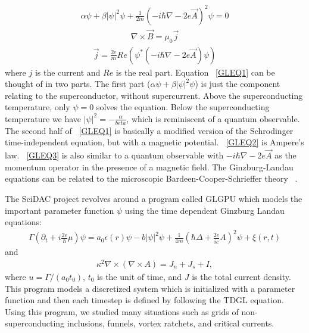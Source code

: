 \begin{eqnarray}
\alpha \psi + \beta |\psi|^2 \psi + \frac {1} {2m} (-i \hbar \nabla - 2 e \overrightarrow A)^2 \psi = 0
\label{GLEQ1}
\end{eqnarray}
\begin{eqnarray}
\nabla \times \overrightarrow B = \mu_0 \overrightarrow j
\label{GLEQ2}
\end{eqnarray}
\begin{eqnarray}
\overrightarrow j = \frac {2e} {m} Re(\psi^* (-i \hbar \nabla - 2 e \overrightarrow A) \psi)
\label{GLEQ3}
\end{eqnarray}
where $j$ is the current and $Re$ is the real part. Equation ~\ref{GLEQ1} can be thought of in two parts. The first part ($\alpha \psi + \beta |\psi|^2 \psi $) is just the component relating to the superconductor, without supercurrent. Above the superconducting temperature, only $\psi = 0$ solves the equation. Below the superconducting temperature we have $|\psi|^2 = -\frac {\alpha} {beta}$, which is reminiscent of a quantum observable. The second half of ~\ref{GLEQ1} is basically a modified version of the Schrodinger time-independent equation, but with a magnetic potential. ~\ref{GLEQ2} is Ampere's law. ~\ref{GLEQ3} is also similar to a quantum observable with $ -i \hbar \nabla - 2e \overrightarrow A$ as the momentum operator in the presence of a magnetic field. The Ginzburg-Landau equations can be related to the microscopic Bardeen-Cooper-Schrieffer theory ~\cite{Sadovskyy14}. 

The SciDAC project revolves around a program called {\sc GLGPU} which models the important parameter function $\psi$ using the time dependent Ginzburg Landau equations:
\begin{eqnarray}
\Gamma (\partial_t +i \frac{2e}{\hbar}\mu)\psi = a_0 \epsilon (r) \psi - b |\psi|^2 \psi + \frac{1}{4m} (\hbar \Delta + \frac{2e}{ic} A)^2 \psi + \xi (r,t)
\label{TDGL1}
\end{eqnarray}
and
\begin{eqnarray}
\kappa^2 \nabla \times (\nabla \times A) = J_n + J_s + I,
\label{TDGL2}
\end{eqnarray}
where $u = \Gamma/(a_0 t_0)$, $t_0$ is the unit of time, and $J$ is the total current density. This program models a discretized system which is initialized with a parameter function and then each timestep is defined by following the TDGL equation. Using this program, we studied many situations such as grids of non-superconducting inclusions, funnels, vortex ratchets, and critical currents.


